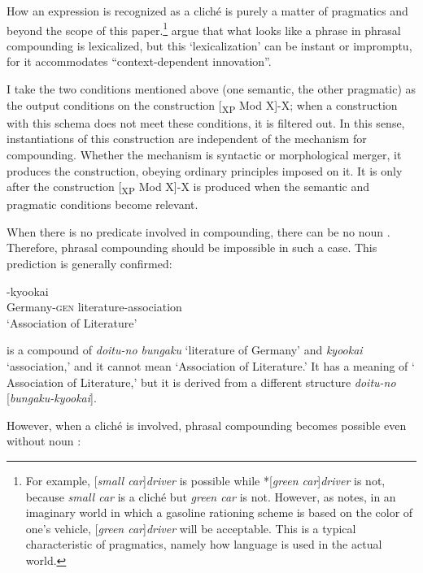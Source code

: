 \documentclass[output=paper]{LSP/langsci}
\begin{document}
How an expression is recognized as a cliché is purely a matter of pragmatics and beyond the scope of this paper.\footnote{For example, [\textit{small car}]\textit{driver} is possible while *[\textit{green car}]\textit{driver} is not, because \textit{small car} is a cliché but \textit{green car} is not. However, as \citet[251]{Sproat1993} notes, in an imaginary world in which a gasoline rationing scheme is based on the color of one’s vehicle, [\textit{green car}]\textit{driver} will be acceptable. This is a typical characteristic of pragmatics, namely how language is used in the actual world.} \citet{BresnanMchombo1995} argue that what looks like a phrase in phrasal compounding is lexicalized, but this ‘lexicalization’ can be instant or impromptu, for it accommodates “context-dependent innovation”.

I take the two conditions mentioned above (one semantic, the other pragmatic) as the output conditions on the construction [\textsubscript{XP} Mod X]-X; when a construction with this schema does not meet these conditions, it is filtered out. In this sense, instantiations of this construction are independent of the mechanism for compounding. Whether the mechanism is syntactic  or morphological merger, it produces the construction, obeying ordinary principles imposed on it. It is only after the construction [\textsubscript{XP} Mod X]-X is produced when the semantic and pragmatic conditions become relevant.

When there is no predicate involved in compounding, there can be no noun . Therefore, phrasal compounding should be impossible in such a case. This prediction is generally confirmed:

\ea\label{ex:nishiyama:25}
-kyookai\\
      Germany-\textsc{gen} literature-association\\
\glt ‘Association of  Literature’
\z

  is a compound of \textit{doitu-no bungaku} ‘literature of Germany’ and \textit{kyookai} ‘association,’ and it cannot mean ‘Association of  Literature.’ It has a meaning of ‘ Association of Literature,’ but it is derived from a different structure \textit{doitu-no} [\textit{bungaku-kyookai}].


However, when a cliché is involved, phrasal compounding becomes possible even without noun :
\end{document}
